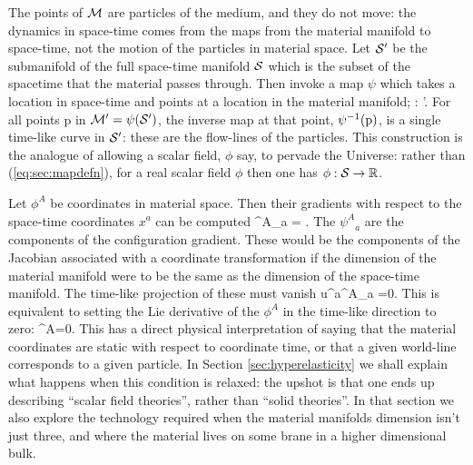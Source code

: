 The points of $\mathcal{M}$ are  particles of the medium, and they do not move: the dynamics in space-time comes from the maps from the material manifold to space-time, not the motion of the particles in material space.  Let  $\mathcal{S}'$ be the submanifold of the full space-time manifold $\mathcal{S}$  which is the subset of the spacetime that the material passes through. Then invoke a map $\psi$ which takes a location in space-time and points at a location in the material manifold;
\bea
\label{eq:sec:mapdefn}
\psi : \stmanif'\longrightarrow \matmanif.
\eea
For all points p in $\mathcal{M}' = \psi(\mathcal{S}')$, the inverse map at that point, $\psi^{-1}({\rm p})$, is a single time-like curve in $\mathcal{S}'$: these are the flow-lines of the particles. This construction is the analogue of allowing a scalar field, $\phi$ say, to pervade the Universe: rather than (\ref{eq:sec:mapdefn}), for a real scalar field $\phi$ then one has $\phi : \mathcal{S}\rightarrow \mathbb{R}$.

Let $\phi^A$ be   coordinates in material space. Then their gradients with respect to the space-time coordinates $x^a$ can be computed
\bea
\label{eq:sec:config_gradient}
{\psi^A}_a = .
\eea
The ${\psi^A}_a$ are   the components of the configuration gradient. These would be the components of the Jacobian associated with a coordinate transformation if the dimension of the material manifold were to be the same as the dimension of the space-time manifold. The time-like projection of these must vanish
\bea
\label{eq:sec:ortho-condition}
u^a{\psi^A}_a =0.
\eea
This is equivalent to setting the Lie derivative of the $\phi^A$ in the time-like direction to zero:
\bea
{}\phi^A=0.
\eea
This has a   direct physical interpretation of saying that the material coordinates are static with respect to coordinate time, or that a given world-line corresponds to a given particle. In Section \ref{sec:hyperelasticity} we shall explain what happens when this condition is relaxed: the upshot is that one ends up describing ``scalar field theories'', rather than ``solid theories''.  In that section we also explore the technology required when the material manifolds dimension isn't just three, and where the material lives on some brane in a higher dimensional bulk.

